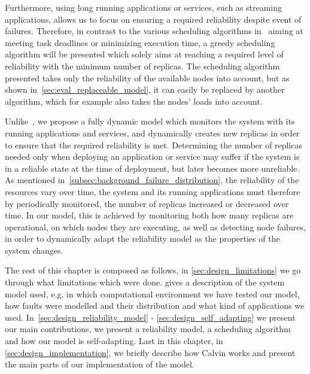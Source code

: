 \documentclass{cslthse-msc}
\begin{document}
Furthermore, using long running applications or services, such as streaming applications, allows us to focus on ensuring a required reliability despite event of failures. Therefore, in contrast to the various scheduling algorithms in~\cite{algoOptTimeMaxRel, optTaskAllocationForMaxRel, taskAllocation, taskAllocationSwarm, algoMaxRelEndToEndConstraint, algoMinExTime, schedReplicas} aiming at meeting task deadlines or minimizing execution time, a greedy scheduling algorithm will be presented which solely aims at reaching a required level of reliability with the minimum number of replicas. The scheduling algorithm presented takes only the reliability of the available nodes into account, but as shown in~\cref{sec:eval_replaceable_model}, it can easily be replaced by another algorithm, which for example also takes the nodes' loads into account.

Unlike~\cite{designFaultTolerantSched, evalReplicationSched, taskSchedulingReplication, effTaskReplMobGrid, relGridServicePredConstraint}, we propose a fully dynamic model which monitors the system with its running applications and services, and dynamically creates new replicas in order to ensure that the required reliability is met. Determining the number of replicas needed only when deploying an application or service may suffer if the system is in a reliable state at the time of deployment, but later becomes more unreliable. As mentioned in~\cref{subsec:background_failure_distribution}, the reliability of the resources vary over time, the system and its running applications must therefore by periodically monitored, the number of replicas increased or decreased over time. In our model, this is achieved by monitoring both how many replicas are operational, on which nodes they are executing, as well as detecting node failures, in order to dynamically adapt the reliability model as the properties of the system changes.

The rest of this chapter is composed as follows, in \cref{sec:design_limitations} we go through what limitations which were done.  gives a description of the system model used, e.g. in which computational environment we have tested our model, how faults were modelled and their distribution and what kind of applications we used. In~\cref{sec:design_reliability_model} - \cref{sec:design_self_adapting} we present our main contributions, we present a reliability model, a scheduling algorithm and how our model is self-adapting. Last in this chapter, in \cref{sec:design_implementation}, we briefly describe how Calvin works and present the main parts of our implementation of the model.
\end{document}
